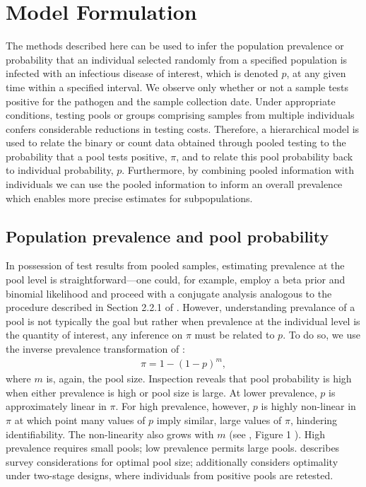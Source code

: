 \documentclass{article}
\begin{document}
\section{Model Formulation}

The methods described here can be used to infer the population prevalence or probability that an individual selected randomly from a specified population is infected with an infectious disease of interest, which is denoted $p$, at any given time within a specified interval. We observe only whether or not a sample tests positive for the pathogen and the sample collection date. Under appropriate conditions, testing pools or groups comprising samples from multiple individuals confers considerable reductions in testing costs. Therefore, a hierarchical model is used to relate the binary or count data obtained through pooled testing to the probability that a pool tests positive, $\pi$, and to relate this pool probability back to individual probability, $p$. Furthermore, by combining pooled information with individuals we can use the pooled information to inform an overall prevalence which enables more precise estimates for subpopulations.

\subsection{Population prevalence and pool probability}

In possession of test results from pooled samples, estimating prevalence at the pool level is straightforward—one could, for example, employ a beta prior and binomial likelihood and proceed with a conjugate analysis analogous to the procedure described in Section 2.2.1 of \cite{hoegh2021estimating}. However, understanding prevalance of a pool is not typically the goal but rather when prevalence at the individual level is the quantity of interest, any inference on $\pi$ must be related to $p$. To do so, we use the inverse prevalence transformation of \cite{colon2001estimating} :
\begin{align}
    \pi = 1 - (1 - p)^m,
\end{align}
where $m$ is, again, the pool size. Inspection reveals that pool probability is high when either prevalence is high or pool size is large. At lower prevalence, $p$ is approximately linear in $\pi$. For high prevalence, however, $p$ is highly non-linear in $\pi$ at which point many values of $p$ imply similar, large values of $\pi$, hindering identifiability. The non-linearity also grows with $m$ (see \cite{colon2001estimating}, Figure 1 ). High prevalence requires small pools; low prevalence permits large pools. \cite{swallow1985group} describes survey considerations for optimal pool size; \cite{reilly1996optimal} additionally considers optimality under two-stage designs, where individuals from positive pools are retested. 
\end{document}
